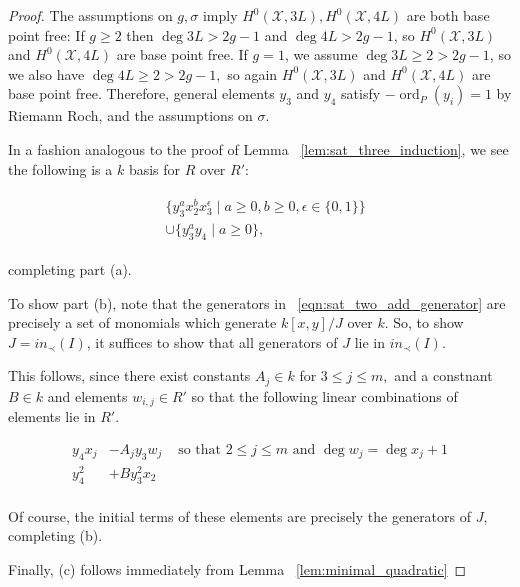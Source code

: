 \documentclass{amsart}
\theoremstyle{plain}
\theoremstyle{definition}
\theoremstyle{remark}
\numberwithin{equation}{section}
\newcommand \sx{\mathscr X}
\DeclareMathOperator{\ord}{ord}
\begin{document}
\begin{proof}
The assumptions on $g,\sigma$ imply $H^0(\sx, 3L), H^0(\sx, 4L)$ are both base point free: If $g \geq 2$ then $\deg 3L > 2g-1$ and $\deg 4L > 2g-1$, so $H^0(\sx, 3L)$ and $H^0(\sx, 4L)$ are base point free. If $g = 1$, we assume $\deg 3L \geq 2 > 2g-1$, so we also have $\deg 4L \geq 2 > 2g -1,$ so again $H^0(\sx, 3L)$ and $H^0(\sx, 4L)$ are base point free. Therefore, general elements $y_3$ and $y_4$ satisfy $-\ord
_P(y_i) = 1$ by Riemann Roch, and the assumptions on $\sigma$.  

In a fashion analogous to the proof of Lemma 
~\ref{lem:sat_three_induction}, we see 
the following is a $k$ basis for $R$ over $R'$:

\begin{align}
\label{eqn:sat_two_add_generator}
	\begin{split}
		&\{ y_3^ax_2^b x_3^\epsilon \mid a \geq 0, b 
		\geq 0, \epsilon \in \{0, 1\}\} \\
		&\cup \{ y_3^ay_4 \mid a \geq 0 \},
	\end{split}
\end{align}

\noindent completing part (a).

To show part (b), note that the generators in
~\ref{eqn:sat_two_add_generator} are precisely a set of monomials which
generate $k[x,y]/J$ over $k$. So, to show $J = in_\prec(I)$, it
suffices to show that all generators of $J$ lie in $in_\prec(I)$.

This follows, since there exist constants $A_j \in k$ for $3 \leq j \leq m,$ and a constnant $B \in k$ and
elements $w_{i,j} \in R'$ so that the following linear combinations
of elements lie in $R'$.

\begin{align*}
	y_4x_j &- A_j y_3 w_j & \text{ so that } 2 \leq j \leq m \text{ and } \deg w_j = \deg x_j + 1\\
	y_4^2 &+ B y_3^2 x_2 \\
\end{align*}

\noindent
Of course, the initial terms of these elements are precisely the
generators of $J$, completing (b).

Finally, (c) follows immediately from Lemma ~\ref{lem:minimal_quadratic}
\end{proof}
\end{document}
